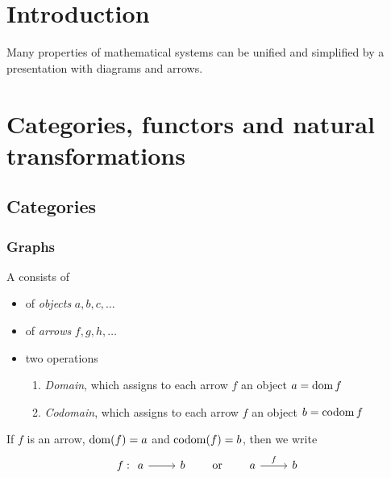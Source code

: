 \chapter{Introduction}
Many properties of mathematical systems can be unified and simplified by a presentation with diagrams and arrows.
\chapter{Categories, functors and natural transformations}
\section{Categories}
\subsection{Graphs}
\begin{definition}
A  consists of
\begin{itemize}
\item of \emph{objects} $a,b,c,\ldots$
\item of \emph{arrows} $f,g,h,\ldots$
\item two operations
\begin{enumerate}
\item \emph{Domain}, which assigns to each arrow $f$ an object $a = \operatorname{dom} f$
\item \emph{Codomain}, which assigns to each arrow $f$ an object $b = \operatorname{codom} f$
\end{enumerate}
\end{itemize}
\end{definition}
If $f$ is an arrow, $\operatorname{dom}(f) = a$ and $\operatorname{codom}(f) = b$, then we write
\[ f: \begin{tikzcd}
a \rar & b
\end{tikzcd} \qquad \text{or} \qquad \begin{tikzcd}
a \rar{f} & b
\end{tikzcd} \]

